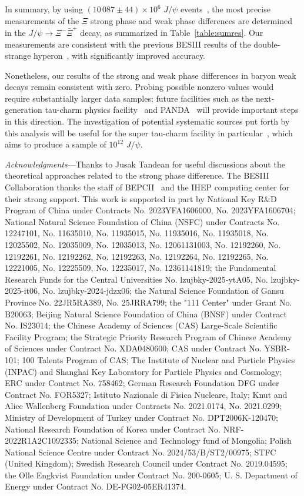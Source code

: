 \documentclass[aps,amsmath,amssymb,reprint]{revtex4-2}
\newcommand{\XXb}{\Xi^{-}\bar{\Xi}^{+}}
\newcommand{\jpsi}{J/\psi}
\begin{document}
In summary, by using $(10\,087\pm44)\times10^{6}$ $\jpsi$ events~\cite{BESIII:2021cxx},
the most precise measurements of the $\Xi$ strong phase and weak phase differences are determined in the $\jpsi\to\XXb$ decay, as summarized in Table~\ref{table:sumres}.
Our measurements are consistent with the previous BESIII results of the double-strange hyperon~\cite{BESIII:2021ypr, BESIII:2022lsz, BESIII:2023jhj}, with significantly improved accuracy.

Nonetheless, our results of the  strong and weak phase differences in baryon weak
decays remain consistent with zero.
Probing possible nonzero values would require substantially larger data samples; future facilities such as the next-generation tau-charm physics facility~\cite{Charm-TauFactory:2013cnj,Achasov:2023gey,Salone:2022lpt} and PANDA~\cite{PANDA:2020zwv} will provide important steps in this direction.
The investigation of potential systematic sources put forth by this analysis will be useful for the super tau-charm facility in particular~\cite{Achasov:2023gey}, which aims to produce a sample of $10^{12}$ $J/\psi$.

\textit{Acknowledgments}—Thanks to Jusak Tandean for useful discussions about the theoretical approaches related to the strong phase difference.
The BESIII Collaboration thanks the staff of BEPCII~\cite{BEPC:2025xni} and the IHEP computing center for their strong support. This work is supported in part by National Key R\&D Program of China under Contracts No. 2023YFA1606000, No. 2023YFA1606704; National Natural Science Foundation of China (NSFC) under Contracts No. 12247101, No. 11635010, No. 11935015, No. 11935016, No. 11935018, No. 12025502, No. 12035009, No. 12035013, No. 12061131003, No. 12192260, No. 12192261, No. 12192262, No. 12192263, No. 12192264, No. 12192265, No. 12221005, No. 12225509, No. 12235017, No. 12361141819;
the Fundamental Research Funds for the Central Universities No. lzujbky-2025-ytA05, No. lzujbky-2025-it06, No. lzujbky-2024-jdzx06; the Natural Science Foundation of Gansu Province No. 22JR5RA389, No. 25JRRA799; the "111 Center" under Grant No. B20063;
Beijing Natural Science Foundation of China (BNSF) under Contract No. IS23014; the Chinese Academy of Sciences (CAS) Large-Scale Scientific Facility Program; the Strategic Priority Research Program of Chinese Academy of Sciences under Contract No. XDA0480600; CAS under Contract No. YSBR-101; 100 Talents Program of CAS; The Institute of Nuclear and Particle Physics (INPAC) and Shanghai Key Laboratory for Particle Physics and Cosmology; ERC under Contract No. 758462; German Research Foundation DFG under Contract No. FOR5327; Istituto Nazionale di Fisica Nucleare, Italy; Knut and Alice Wallenberg Foundation under Contracts No. 2021.0174, No. 2021.0299; Ministry of Development of Turkey under Contract No. DPT2006K-120470; National Research Foundation of Korea under Contract No. NRF-2022R1A2C1092335; National Science and Technology fund of Mongolia; Polish National Science Centre under Contract No. 2024/53/B/ST2/00975; STFC (United Kingdom); Swedish Research Council under Contract No. 2019.04595; the Olle Engkvist Foundation under Contract No. 200-0605; U. S. Department of Energy under Contract No. DE-FG02-05ER41374.
\end{document}
